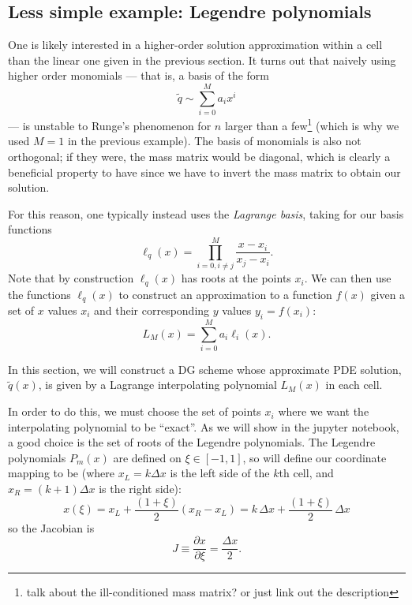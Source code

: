 \documentclass[12pt]{article}
\numberwithin{equation}{section}
\begin{document}
\subsection{Less simple example: Legendre polynomials}

One is likely interested in a higher-order solution approximation within a cell than the linear one given in the previous section.
It turns out that naively using higher order monomials --- that is, a basis of the form 
\begin{equation}
\tilde{q} \sim \sum_{i=0}^M a_i x^i
\end{equation}
--- is unstable to Runge's phenomenon for $n$ larger than a few\footnote{talk about the ill-conditioned mass matrix? or just link out the description} (which is why we used $M=1$ in the previous example).
The basis of monomials is also not orthogonal; if they were, the mass matrix would be diagonal, which is clearly a beneficial property to have since we have to invert the mass matrix to obtain our solution.

For this reason, one typically instead uses the \textit{Lagrange basis}, taking for our basis functions
\begin{equation}
\ell_{q}(x) = \prod_{i=0, i \neq j}^{M} \frac{x - x_i}{x_j - x_i}.
\end{equation}
Note that by construction $\ell_q(x)$ has roots at the points $x_i$.
We can then use the functions $\ell_{q}(x)$ to construct an approximation to a function $f(x)$ given a set of $x$ values $x_i$ and their corresponding $y$ values $y_i = f(x_i)$:
\begin{equation}
L_M(x) = \sum_{i=0}^{M} a_i \ell_i(x).
\end{equation}

In this section, we will construct a DG scheme whose approximate PDE solution, $\tilde{q}(x)$, is given by a Lagrange interpolating polynomial $L_M(x)$ in each cell.

In order to do this, we must choose the set of points $x_i$ where we want the interpolating polynomial to be ``exact''.
As we will show in the jupyter notebook, a good choice is the set of roots of the Legendre polynomials.
The Legendre polynomials $P_m(x)$ are defined on $\xi \in [-1, 1]$, so will define our coordinate mapping to be (where $x_L = k \Delta x$ is the left side of the $k$th cell, and $x_R = (k+1) \Delta x$ is the right side):
\begin{equation}
x(\xi) = x_L + \frac{(1+\xi)}{2} (x_R - x_L) = k \, \Delta x + \frac{(1+\xi)}{2} \, \Delta x
\end{equation}
so the Jacobian is
\begin{equation}
J \equiv \frac{\partial x}{\partial \xi} = \frac{\Delta x}{2}.
\end{equation}
\end{document}
